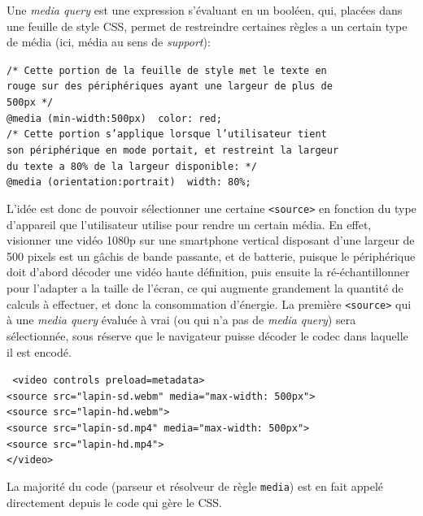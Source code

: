 \documentclass[a4paper,10pt]{article}
\newcommand{\cc}[1]{\texttt{#1}}
\begin{document}
\begin{multicols}{2}
  Une \emph{media query} est une expression s'évaluant en un booléen, qui,
  placées dans une feuille de style CSS, permet de restreindre certaines règles
  a un certain type de média (ici, média au sens de \emph{support}):

  \noindent
  {\footnotesize
  \cc{/* Cette portion de la feuille de style met le texte en\\
     rouge sur des périphériques ayant une largeur de plus de\\
     500px */\\
     @media (min-width:500px) { color: red; }\\
     /* Cette portion s'applique lorsque l'utilisateur tient\\
     son périphérique en mode portait, et restreint la largeur\\
     du texte a 80\% de la largeur disponible: */ \\
     @media (orientation:portrait) { width: 80\%; }
  }}

  L'idée est donc de pouvoir sélectionner une certaine \cc{<source>} en fonction
  du type d'appareil que l'utilisateur utilise pour rendre un certain média. En
  effet, visionner une vidéo 1080p sur une smartphone vertical disposant d'une
  largeur de 500 pixels est un gâchis de bande passante, et de batterie, puisque
  le périphérique doit d'abord décoder une vidéo haute définition, puis ensuite
  la ré-échantillonner pour l'adapter a la taille de l'écran, ce qui augmente
  grandement la quantité de calculs à effectuer, et donc la consommation d'énergie. La première
  \cc{<source>} qui à une \emph{media query} évaluée à vrai (ou qui n'a pas de \emph{media
  query}) sera sélectionnée, sous réserve que le navigateur puisse décoder le
  codec dans laquelle il est encodé.

  \noindent
  {\footnotesize
    \cc{%
      <video controls preload=metadata>\\
      <source src="lapin-sd.webm" media="max-width: 500px">\\
      <source src="lapin-hd.webm">\\
      <source src="lapin-sd.mp4" media="max-width: 500px">\\
      <source src="lapin-hd.mp4">\\
      </video>\\
    }
  }

  La majorité du code (parseur et résolveur de règle \cc{media}) est en fait
  appelé directement depuis le code qui gère le CSS.


\end{multicols}
\end{document}

